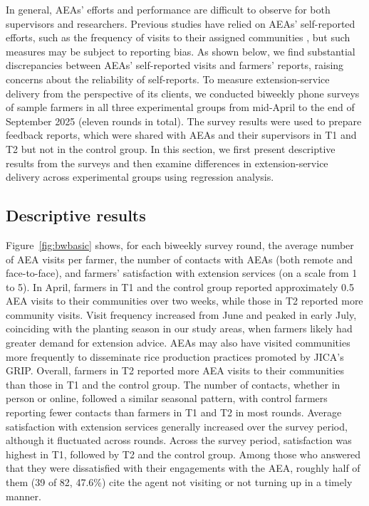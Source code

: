 \documentclass[11pt]{article}
\begin{document}
In general, AEAs' efforts and performance are difficult to observe for both supervisors and researchers. Previous studies have relied on AEAs' self-reported efforts, such as the frequency of visits to their assigned communities \citep[e.g.,][]{Alam2024}, but such measures may be subject to reporting bias. As shown below, we find substantial discrepancies between AEAs' self-reported visits and farmers' reports, raising concerns about the reliability of self-reports. To measure extension-service delivery from the perspective of its clients, we conducted biweekly phone surveys of sample farmers in all three experimental groups from mid-April to the end of September 2025 (eleven rounds in total). The survey results were used to prepare feedback reports, which were shared with AEAs and their supervisors in T1 and T2 but not in the control group. In this section, we first present descriptive results from the surveys and then examine differences in extension-service delivery across experimental groups using regression analysis.

\subsection{Descriptive results}

Figure~\ref{fig:bwbasic} shows, for each biweekly survey round, the average number of AEA visits per farmer, the number of contacts with AEAs (both remote and face-to-face), and farmers' satisfaction with extension services (on a scale from 1 to 5). In April, farmers in T1 and the control group reported approximately 0.5 AEA visits to their communities over two weeks, while those in T2 reported more community visits. Visit frequency increased from June and peaked in early July, coinciding with the planting season in our study areas, when farmers likely had greater demand for extension advice. AEAs may also have visited communities more frequently to disseminate rice production practices promoted by JICA's GRIP. Overall, farmers in T2 reported more AEA visits to their communities than those in T1 and the control group. The number of contacts, whether in person or online, followed a similar seasonal pattern, with control farmers reporting fewer contacts than farmers in T1 and T2 in most rounds. Average satisfaction with extension services generally increased over the survey period, although it fluctuated across rounds. Across the survey period, satisfaction was highest in T1, followed by T2 and the control group. Among those who answered that they were dissatisfied with their engagements with the AEA, roughly half of them (39 of 82, 47.6\%) cite the agent not visiting or not turning up in a timely manner. 
\end{document}
